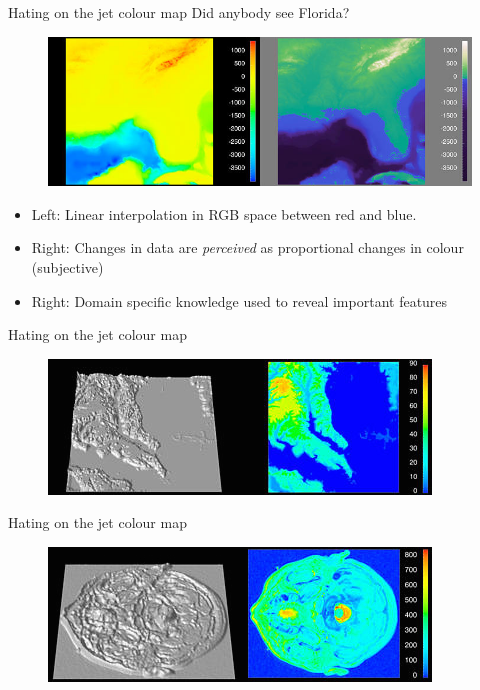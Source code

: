 \documentclass[10pt,presentation,compress]{beamer}
\begin{document}
\begin{frame}{Hating on the jet colour map}
  Did anybody see Florida?
  \begin{figure}[htp]
    \includegraphics[scale=7.0]{florida.jpg}
  \end{figure}
  \begin{itemize}
    \item Left: Linear interpolation in RGB space between red and blue.
    \item Right: Changes in data are \textit{perceived} as proportional
      changes in colour (subjective)
    \item Right: Domain specific knowledge used to reveal important features
  \end{itemize}
\end{frame}

\begin{frame}{Hating on the jet colour map}
  \begin{figure}[htp]
    \includegraphics[scale=0.75]{chesapeake.jpg}
  \end{figure}
\end{frame}

\begin{frame}{Hating on the jet colour map}
  \begin{figure}[htp]
    \includegraphics[scale=0.75]{mri.jpg}
  \end{figure}
\end{frame}
\end{document}
